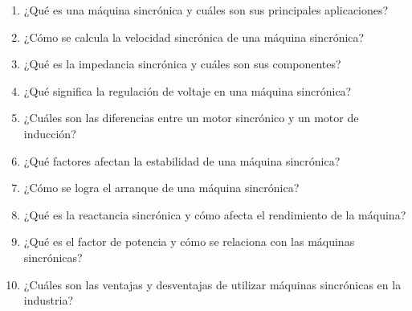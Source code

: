 \documentclass[../main]{subfiles}
\begin{document}


\begin{enumerate}
    \item ¿Qué es una máquina sincrónica y cuáles son sus principales aplicaciones?
    \item ¿Cómo se calcula la velocidad sincrónica de una máquina sincrónica?
    \item ¿Qué es la impedancia sincrónica y cuáles son sus componentes?
    \item ¿Qué significa la regulación de voltaje en una máquina sincrónica?
    \item ¿Cuáles son las diferencias entre un motor sincrónico y un motor de inducción?
    \item ¿Qué factores afectan la estabilidad de una máquina sincrónica?
    \item ¿Cómo se logra el arranque de una máquina sincrónica?
    \item ¿Qué es la reactancia sincrónica y cómo afecta el rendimiento de la máquina?
    \item ¿Qué es el factor de potencia y cómo se relaciona con las máquinas sincrónicas?
    \item ¿Cuáles son las ventajas y desventajas de utilizar máquinas sincrónicas en la industria?
\end{enumerate}
\end{document}
